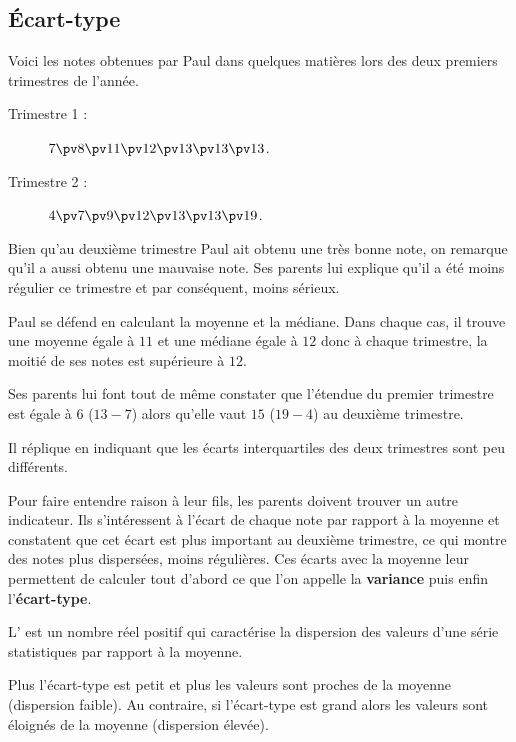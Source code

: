 \documentclass[10pt,openright,twoside,french]{book}
\begin{document}
\subsection{\'Ecart-type}
\begin{Exemple}
    Voici les notes obtenues par Paul dans quelques matières lors des deux premiers trimestres de l'année.
\begin{description}
        \item[Trimestre 1 :] $7 \pv 8 \pv 11 \pv 12 \pv 13 \pv 13 \pv 13$.
        \item[Trimestre 2 :] $4 \pv 7 \pv 9 \pv 12 \pv 13 \pv 13 \pv 19$.
    \end{description}
    Bien qu'au deuxième trimestre Paul ait obtenu une très bonne note, on remarque qu'il a aussi obtenu une mauvaise note. Ses parents lui explique qu'il a été moins régulier ce trimestre et par conséquent, moins sérieux.

    Paul se défend en calculant la moyenne et la médiane. Dans chaque cas, il trouve une moyenne égale à $11$ et une médiane égale à $12$ donc à chaque trimestre, la moitié de ses notes est supérieure à $12$.

    Ses parents lui font tout de même constater que l'étendue du premier trimestre est égale à $6$ ($13 - 7$) alors qu'elle vaut $15$ ($19 - 4$) au deuxième trimestre.

    Il réplique en indiquant que les écarts interquartiles des deux trimestres sont peu différents.

    Pour faire entendre raison à leur fils, les parents doivent trouver un autre indicateur. Ils s'intéressent à l'écart de chaque note par rapport à la moyenne et constatent que cet écart est plus important au deuxième trimestre, ce qui montre des notes plus dispersées, moins régulières. Ces écarts avec la moyenne leur permettent de calculer tout d'abord ce que l'on appelle la \textbf{variance} puis enfin l'\textbf{écart-type}.
\end{Exemple}

\begin{Defi}
    L' est un nombre réel positif qui caractérise la dispersion des valeurs d'une série statistiques par rapport à la moyenne.

    Plus l'écart-type est petit et plus les valeurs sont proches de la moyenne (dispersion faible). Au contraire, si l'écart-type est grand alors les valeurs sont éloignés de la moyenne (dispersion élevée).
\end{Defi}
\end{document}
